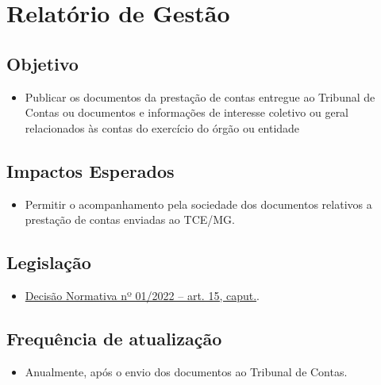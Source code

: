 \documentclass[
]{book}
\providecommand{\tightlist}{%
  \setlength{\itemsep}{0pt}\setlength{\parskip}{0pt}}
\begin{document}
\hypertarget{relatuxf3rio-de-gestuxe3o}{%
\section{Relatório de Gestão}\label{relatuxf3rio-de-gestuxe3o}}

\hypertarget{objetivo-12}{%
\subsection{Objetivo}\label{objetivo-12}}

\begin{itemize}
\tightlist
\item
  Publicar os documentos da prestação de contas entregue ao Tribunal de Contas ou documentos e informações de interesse coletivo ou geral relacionados às contas do exercício do órgão ou entidade
\end{itemize}

\hypertarget{impactos-esperados-13}{%
\subsection{Impactos Esperados}\label{impactos-esperados-13}}

\begin{itemize}
\tightlist
\item
  Permitir o acompanhamento pela sociedade dos documentos relativos a prestação de contas enviadas ao TCE/MG.
\end{itemize}

\hypertarget{legislauxe7uxe3o-13}{%
\subsection{Legislação}\label{legislauxe7uxe3o-13}}

\begin{itemize}
\tightlist
\item
  \href{https://tclegis.tce.mg.gov.br/Home/Detalhe/1141129}{Decisão Normativa nº 01/2022 -- art. 15, caput.}.
\end{itemize}

\hypertarget{frequuxeancia-de-atualizauxe7uxe3o-12}{%
\subsection{Frequência de atualização}\label{frequuxeancia-de-atualizauxe7uxe3o-12}}

\begin{itemize}
\tightlist
\item
  Anualmente, após o envio dos documentos ao Tribunal de Contas.
\end{itemize}
\end{document}
